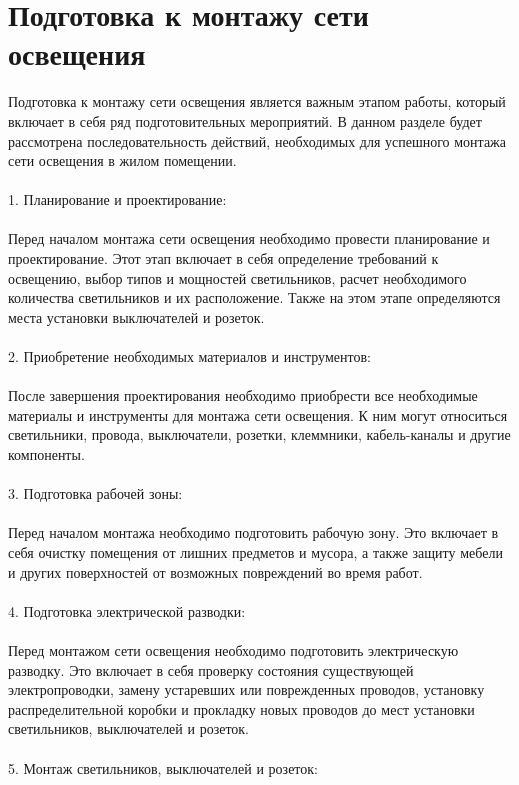 \documentclass{article}
\begin{document}
\section{Подготовка к монтажу сети освещения}
Подготовка к монтажу сети освещения является важным этапом работы, который включает в себя ряд подготовительных мероприятий. В данном разделе будет рассмотрена последовательность действий, необходимых для успешного монтажа сети освещения в жилом помещении.\\
~\\
1. Планирование и проектирование:\\
~\\
Перед началом монтажа сети освещения необходимо провести планирование и проектирование. Этот этап включает в себя определение требований к освещению, выбор типов и мощностей светильников, расчет необходимого количества светильников и их расположение. Также на этом этапе определяются места установки выключателей и розеток.\\
~\\
2. Приобретение необходимых материалов и инструментов:\\
~\\
После завершения проектирования необходимо приобрести все необходимые материалы и инструменты для монтажа сети освещения. К ним могут относиться светильники, провода, выключатели, розетки, клеммники, кабель-каналы и другие компоненты.\\
~\\
3. Подготовка рабочей зоны:\\
~\\
Перед началом монтажа необходимо подготовить рабочую зону. Это включает в себя очистку помещения от лишних предметов и мусора, а также защиту мебели и других поверхностей от возможных повреждений во время работ.\\
~\\
4. Подготовка электрической разводки:\\
~\\
Перед монтажом сети освещения необходимо подготовить электрическую разводку. Это включает в себя проверку состояния существующей электропроводки, замену устаревших или поврежденных проводов, установку распределительной коробки и прокладку новых проводов до мест установки светильников, выключателей и розеток.\\
~\\
5. Монтаж светильников, выключателей и розеток:\\
~\\
\end{document}
